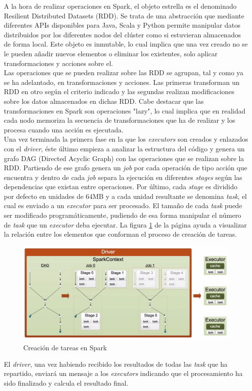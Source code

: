 A la hora de realizar operaciones en Spark, el objeto estrella es el denominado Resilient Distributed Datasets (RDD)\cite{zaharia2012resilient}. Se trata de una abstracción que mediante diferentes APIs disponibles para Java, Scala y Python permite manipular datos distribuidos por los diferentes nodos del clúster como si estuvieran almacenados de forma local. Este objeto es inmutable, lo cual implica que una vez creado no se le pueden añadir nuevos elementos o eliminar los existentes, solo aplicar transformaciones y acciones sobre el.\\

Las operaciones que se pueden realizar sobre las RDD se agrupan, tal y como ya se ha adelantado, en transformaciones y acciones. Las primeras transforman un RDD en otro según el criterio indicado y las segundas realizan modificaciones sobre los datos almacenados en dichas RDD. Cabe destacar que las transformaciones en Spark son operaciones "lazy", lo cual implica que en realidad cada nodo memoriza la secuencia de transformaciones que ha de realizar y los procesa cuando una acción es ejecutada.\\

Una vez terminada la primera fase en la que los \textit{executors} son creados y enlazados con el \textit{driver}, éste último empieza a analizar la estructura del código y genera un grafo DAG (Directed Acyclic Graph)\cite{thulasiraman19925}\cite{bang20082} con las operaciones que se realizan sobre la RDD. Partiendo de ese grafo genera un \textit{job} por cada operación de tipo acción que encuentra y dentro de cada \textit{job} separa la ejecución en diferentes \textit{stages} según las dependencias que existan entre operaciones. Por último, cada \textit{stage} es dividido por defecto en unidades de 64MB y a cada unidad resultante se denomina \textit{task}, el cual es enviado a un \textit{executor} para ser procesado. El tamaño de cada \textit{task} puede ser modificado programáticamente, pudiendo de esa forma manipular el número de \textit{task} que un \textit{executor} deba ejecutar. La figura \ref{fig:spark_task_creation} de la página \pageref{fig:spark_task_creation} ayuda a visualizar la relación entre los elementos que conforman el proceso de creación de tareas.

\begin{figure}[h]
	\centering
	\includegraphics[width=1\textwidth]{Ilustraciones/spark_task_creation.png}
	\caption{Creación de tareas en Spark}
	\label{fig:spark_task_creation}
\end{figure}

El \textit{driver}, una vez habiendo recibido los resultados de todas las \textit{task} que ha repartido, enviará un mensaje a los \textit{executors}
indicando que el procesamiento ha sido finalizado y calcula el resultado final.